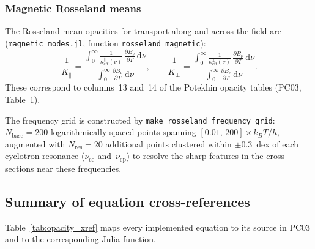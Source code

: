 \subsubsection{Magnetic Rosseland means}

\noindent
The Rosseland mean opacities for transport along and across the field are
(\texttt{magnetic\_modes.jl}, function \texttt{rosseland\_magnetic}):
%
\begin{equation}
\label{eq:ross_mag}
\frac{1}{K_\parallel}
  = \frac{\displaystyle\int_0^\infty
      \frac{1}{\kappa_{\mathrm{eff}}^\parallel(\nu)}\,
      \frac{\partial B_\nu}{\partial T}\,\mathrm{d}\nu}
    {\displaystyle\int_0^\infty
      \frac{\partial B_\nu}{\partial T}\,\mathrm{d}\nu},
\qquad
\frac{1}{K_\perp}
  = \frac{\displaystyle\int_0^\infty
      \frac{1}{\kappa_{\mathrm{eff}}^\perp(\nu)}\,
      \frac{\partial B_\nu}{\partial T}\,\mathrm{d}\nu}
    {\displaystyle\int_0^\infty
      \frac{\partial B_\nu}{\partial T}\,\mathrm{d}\nu}.
\end{equation}
%
These correspond to columns~13 and~14 of the Potekhin opacity tables
(PC03, Table~1).

The frequency grid is constructed by \texttt{make\_rosseland\_frequency\_grid}:
$N_{\mathrm{base}}=200$ logarithmically spaced points spanning
$[0.01,\,200]\times k_B T/h$, augmented with $N_{\mathrm{res}}=20$
additional points clustered within $\pm 0.3$~dex of each cyclotron
resonance ($\nu_{\mathrm{ce}}$ and~$\nu_{\mathrm{cp}}$) to resolve the
sharp features in the cross-sections near these frequencies.


\subsection{Summary of equation cross-references}
\label{sec:opacity:xref}

Table~\ref{tab:opacity_xref} maps every implemented equation to
its source in PC03 and to the corresponding Julia function.

